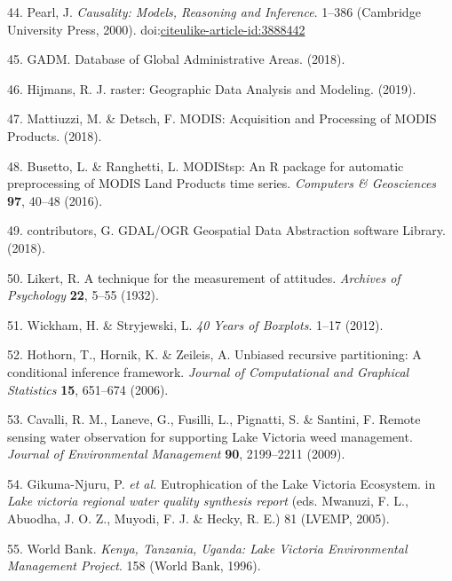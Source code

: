 \documentclass[12pt,oneside]{article}
\begin{document}
\leavevmode\hypertarget{ref-Pearl_2000}{}%
44. Pearl, J. \emph{Causality: Models, Reasoning and Inference}. 1--386 (Cambridge University Press, 2000). doi:\href{https://doi.org/citeulike-article-id:3888442}{citeulike-article-id:3888442}

\leavevmode\hypertarget{ref-GADM_2018}{}%
45. GADM. Database of Global Administrative Areas. (2018).

\leavevmode\hypertarget{ref-Hijmans_2019}{}%
46. Hijmans, R. J. raster: Geographic Data Analysis and Modeling. (2019).

\leavevmode\hypertarget{ref-Mattiuzzi_and_Detsch_2018}{}%
47. Mattiuzzi, M. \& Detsch, F. MODIS: Acquisition and Processing of MODIS Products. (2018).

\leavevmode\hypertarget{ref-Busetto_and_ranghetti_2016}{}%
48. Busetto, L. \& Ranghetti, L. MODIStsp: An R package for automatic preprocessing of MODIS Land Products time series. \emph{Computers \& Geosciences} \textbf{97}, 40--48 (2016).

\leavevmode\hypertarget{ref-GDAL_OGRcontributors_2018}{}%
49. contributors, G. GDAL/OGR Geospatial Data Abstraction software Library. (2018).

\leavevmode\hypertarget{ref-Likert_1932}{}%
50. Likert, R. A technique for the measurement of attitudes. \emph{Archives of Psychology} \textbf{22}, 5--55 (1932).

\leavevmode\hypertarget{ref-Wickham_and_Stryjewski_2012}{}%
51. Wickham, H. \& Stryjewski, L. \emph{40 Years of Boxplots}. 1--17 (2012).

\leavevmode\hypertarget{ref-Hothorn_et_al_2006}{}%
52. Hothorn, T., Hornik, K. \& Zeileis, A. Unbiased recursive partitioning: A conditional inference framework. \emph{Journal of Computational and Graphical Statistics} \textbf{15}, 651--674 (2006).

\leavevmode\hypertarget{ref-Cavalli_et_al_2009}{}%
53. Cavalli, R. M., Laneve, G., Fusilli, L., Pignatti, S. \& Santini, F. Remote sensing water observation for supporting Lake Victoria weed management. \emph{Journal of Environmental Management} \textbf{90}, 2199--2211 (2009).

\leavevmode\hypertarget{ref-Gikuma-Njuru_et_al_2005}{}%
54. Gikuma-Njuru, P. \emph{et al.} Eutrophication of the Lake Victoria Ecosystem. in \emph{Lake victoria regional water quality synthesis report} (eds. Mwanuzi, F. L., Abuodha, J. O. Z., Muyodi, F. J. \& Hecky, R. E.) 81 (LVEMP, 2005).

\leavevmode\hypertarget{ref-World_Bank_1996}{}%
55. World Bank. \emph{Kenya, Tanzania, Uganda: Lake Victoria Environmental Management Project}. 158 (World Bank, 1996).
\end{document}
